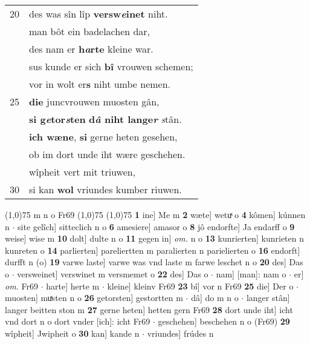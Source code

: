 \documentclass[8pt,a4paper,notitlepage]{article}
\begin{document}
\begin{table}[ht]
\begin{minipage}[t]{0.5\linewidth}
\begin{tabular}{rl}
20 & des was sîn lîp \textbf{versw\textit{e}inet} niht.\\ 
 & man bôt ein badelachen dar,\\ 
 & des nam er \textbf{h\textit{a}rte} kleine war.\\ 
 & sus kunde er sich \textbf{bî} vrouwen schemen;\\ 
 & vor in wolt er\textbf{s} niht umbe nemen.\\ 
25 & \textbf{die} juncvrouwen muosten gân,\\ 
 & \textbf{si g\textit{e}tor\textit{s}ten} \textbf{d\textit{â} niht lange\textit{r}} \textit{s}tân.\\ 
 & \textbf{ich wæne}, \textbf{si} gerne heten gesehen,\\ 
 & ob im dort unde iht wære geschehen.\\ 
 & wîpheit vert mit triuwen,\\ 
30 & si kan \textbf{wol} vriundes kumber riuwen.\\ 
\end{tabular}
\scriptsize
\line(1,0){75} \newline
m n o Fr69 \newline
\line(1,0){75} \newline
\newline
\line(1,0){75} \newline
\textbf{1} ine] Me m \textbf{2} wæte] wetuͯ o \textbf{4} kômen] kúnnen n  $\cdot$ site gelîch] sitteclich n o \textbf{6} amesiere] amasor o \textbf{8} jô endorfte] Ja endarff o \textbf{9} weise] wise m \textbf{10} dolt] dulte n o \textbf{11} gegen in] \textit{om.} n o \textbf{13} kunrierten] kunrieten n kunreten o \textbf{14} parlierten] pareliertten m paralierten n parielierten o \textbf{16} endorft] durfft n (o) \textbf{19} varwe laste] varwe was vnd laste m farwe leschet n o \textbf{20} des] Das o  $\cdot$ versweinet] verswinet m versmemet o \textbf{22} des] Das o  $\cdot$ nam] [man]: nam o  $\cdot$ er] \textit{om.} Fr69  $\cdot$ harte] herte m  $\cdot$ kleine] kleinv Fr69 \textbf{23} bî] vor n Fr69 \textbf{25} die] Der o  $\cdot$ muosten] muͯsten n o \textbf{26} getorsten] gestortten m  $\cdot$ dâ] do m n o  $\cdot$ langer stân] langer beitten ston m \textbf{27} gerne heten] hetten gern Fr69 \textbf{28} dort unde iht] icht vnd dort n o dort vnder [ich]: icht Fr69  $\cdot$ geschehen] beschehen n o (Fr69) \textbf{29} wîpheit] Jwipheit o \textbf{30} kan] kande n  $\cdot$ vriundes] frúdes n \newline
\end{minipage}
\end{table}
\end{document}
